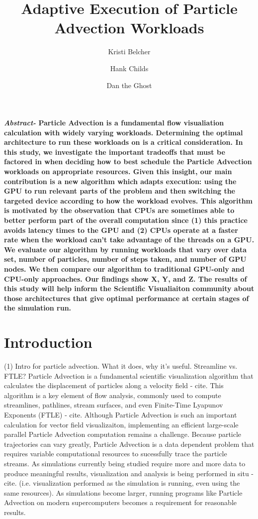 \documentclass{IEEEtran}
\title{Adaptive Execution of Particle Advection Workloads}
\author[*]{Kristi Belcher}
\author[*]{Hank Childs}
\author[**]{Dan the Ghost}
\affil[*]{University of Oregon}
\affil[**]{Oak Ridge National Lab}
\begin{document}
\maketitle
%
\textbf{\textit{Abstract-} Particle Advection is a fundamental flow visualiation calculation with widely varying workloads. 
%
Determining the optimal architecture to run these workloads on is a critical consideration. 
%
In this study, we investigate the important tradeoffs that must be factored in when deciding how to best schedule the Particle Advection workloads on appropriate resources. 
%
Given this insight, our main contribution is a new algorithm which adapts execution: using the GPU to run relevant parts of the problem and then switching the targeted device according to how the workload evolves.
%
This algorithm is motivated by the observation that CPUs are sometimes able to better perform part of the overall computation since (1) this practice avoids latency times to the GPU and (2) CPUs operate at a faster rate when the workload can't take advantage of the threads on a GPU.
%
We evaluate our algorithm by running workloads that vary over data set, number of particles, number of steps taken, and number of GPU nodes.
%
We then compare our algorithm to traditional GPU-only and CPU-only approaches.
%
Our findings show X, Y, and Z.
%
The results of this study will help inform the Scientific Visualiaiton community about those architectures that give optimal performance at certain stages of the simulation run.}
%
\section{Introduction}
%
(1) Intro for particle advection. What it does, why it's useful. Streamline vs. FTLE?
%
Particle Advection is a fundamental scientific visualization algorithm that calculates the displacement of particles along a velocity field - cite. 
%
This algorithm is a key element of flow analysis, commonly used to compute streamlines, pathlines, stream surfaces, and even Finite-Time Lyapunov Exponents (FTLE) - cite.
%
Although Particle Advection is such an important calculation for vector field visualizaiton, implementing an efficient large-scale parallel Particle Advection computation remains a challenge.
%
Because particle trajectories can vary greatly, Particle Advection is a data dependent problem that requires variable computational resources to sucessfully trace the particle streams.
%
As simulations currently being studied require more and more data to produce meaningful results, visualization and analysis is being performed in situ - cite.
%
(i.e. visualization performed as the simulation is running, even using the same resources).
%
As simulations become larger, running programs like Particle Advection on modern supercomputers becomes a requirement for reasonable results.
\end{document}

